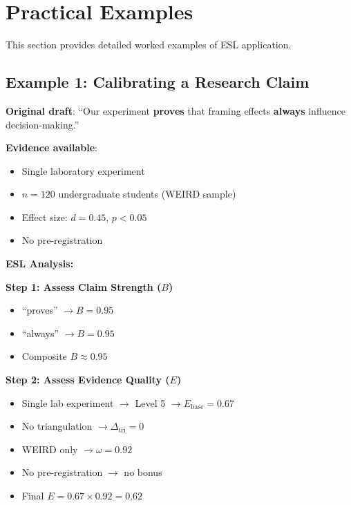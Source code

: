 \documentclass[11pt,a4paper]{article}
\begin{document}
\section{Practical Examples}
\label{sec:practical}


This section provides detailed worked examples of ESL application.

\subsection{Example 1: Calibrating a Research Claim}

\begin{practicalbox}[title={Scenario: Writing a Research Abstract}]
\textbf{Original draft}: ``Our experiment \textbf{proves} that framing effects \textbf{always} influence decision-making.''

\textbf{Evidence available}:
\begin{itemize}
    \item Single laboratory experiment
    \item $n = 120$ undergraduate students (WEIRD sample)
    \item Effect size: $d = 0.45$, $p < 0.05$
    \item No pre-registration
\end{itemize}
\end{practicalbox}

\textbf{ESL Analysis:}

\textbf{Step 1: Assess Claim Strength ($B$)}
\begin{itemize}
    \item ``proves'' $\to B = 0.95$
    \item ``always'' $\to B = 0.95$
    \item Composite $B \approx 0.95$
\end{itemize}

\textbf{Step 2: Assess Evidence Quality ($E$)}
\begin{itemize}
    \item Single lab experiment $\to$ Level 5 $\to E_{\text{base}} = 0.67$
    \item No triangulation $\to \Delta_{\text{tri}} = 0$
    \item WEIRD only $\to \omega = 0.92$
    \item No pre-registration $\to$ no bonus
    \item Final $E = 0.67 \times 0.92 = 0.62$
\end{itemize}
\end{document}
